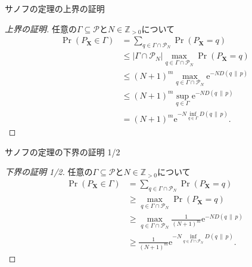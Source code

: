 \documentclass[lualatex,handout]{beamer}
\newcommand\KL[2]{D(#1\,\|\,#2)}
\theoremstyle{definition}
\begin{document}
\begin{frame}{サノフの定理の上界の証明}
\footnotesize
\sanov
\begin{proof}[\small 上界の証明]
任意の$\Gamma\subseteq\mathcal{P}$と$N\in\mathbb{Z}_{>0}$について
\begin{align*}
\Pr(P_{\symbf{X}}\in\Gamma) &= \sum_{q\in\Gamma\cap\mathcal{P}_N} \Pr(P_{\symbf{X}} = q)\\
 &\le |\Gamma\cap\mathcal{P}_N| \max_{q\in\Gamma\cap\mathcal{P}_N}\Pr(P_{\symbf{X}} = q)\\
 &\le (N+1)^m \max_{q\in\Gamma\cap\mathcal{P}_N}\mathrm{e}^{-N\KL{q}{p}}\\
 &\le (N+1)^m \sup_{q\in\Gamma}\mathrm{e}^{-N\KL{q}{p}}\\
 &= (N+1)^m \mathrm{e}^{-N\inf_{q\in\Gamma}\KL{q}{p}}.
\end{align*}
\end{proof}
\end{frame}


\begin{frame}{サノフの定理の下界の証明 1/2}
\footnotesize
\sanov
\begin{proof}[\small 下界の証明 1/2]
任意の$\Gamma\subseteq\mathcal{P}$と$N\in\mathbb{Z}_{>0}$について
\begin{align*}
\Pr(P_{\symbf{X}}\in\Gamma) &= \sum_{q\in\Gamma\cap\mathcal{P}_N} \Pr(P_{\symbf{X}} = q)\\
 &\ge \max_{q\in\Gamma\cap\mathcal{P}_N}\Pr(P_{\symbf{X}} = q)\\
 &\ge \max_{q\in\Gamma\cap\mathcal{P}_N}\frac1{(N+1)^m}\mathrm{e}^{-N\KL{q}{p}}\\
 &\ge \frac1{(N+1)^m}\mathrm{e}^{-N\inf_{q\in\Gamma\cap\mathcal{P}_N}\KL{q}{p}}.
\end{align*}
\end{proof}
\end{frame}
\end{document}

